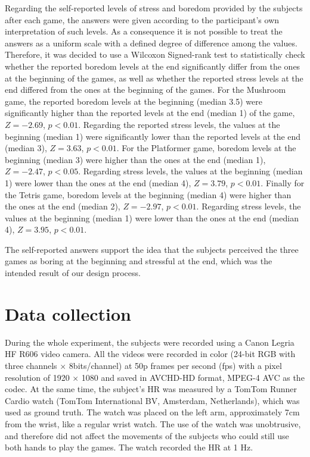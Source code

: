 Regarding the self-reported levels of stress and boredom provided by the subjects after each game, the answers were given according to the participant's own interpretation of such levels. As a consequence it is not possible to treat the answers as a uniform scale with a defined degree of difference among the values. Therefore, it was decided to use a Wilcoxon Signed-rank test to statistically check whether the reported boredom levels at the end significantly differ from the ones at the beginning of the games, as well as whether the reported stress levels at the end differed from the ones at the beginning of the games. For the Mushroom game, the reported boredom levels at the beginning (median 3.5) were significantly higher than the reported levels at the end (median 1) of the game, $Z=-2.69$, $p<0.01$. Regarding the reported stress levels, the values at the beginning (median 1) were significantly lower than the reported levels at the end (median 3), $Z=3.63$, $p<0.01$. For the Platformer game, boredom levels at the beginning (median 3) were higher than the ones at the end (median 1), $Z=-2.47$, $p<0.05$. Regarding stress levels, the values at the beginning (median 1) were lower than the ones at the end (median 4), $Z=3.79$, $p<0.01$. Finally for the Tetris game, boredom levels at the beginning (median 4) were higher than the ones at the end (median 2), $Z=-2.97$, $p<0.01$. Regarding stress levels, the values at the beginning (median 1) were lower than the ones at the end (median 4), $Z=3.95$, $p<0.01$.

The self-reported answers support the idea that the subjects perceived the three games as boring at the beginning and stressful at the end, which was the intended result of our design process.

\section{Data collection}

During the whole experiment, the subjects were recorded using a Canon Legria HF R606 video camera. All the videos were recorded in color (24-bit RGB with three channels $\times$ 8bits/channel) at 50p frames per second (fps) with a pixel resolution of 1920 $\times$ 1080 and saved in AVCHD-HD format, MPEG-4 AVC as the codec. At the same time, the subject's HR was measured by a TomTom Runner Cardio watch (TomTom International BV, Amsterdam, Netherlands), which was used as ground truth. The watch was placed on the left arm, approximately 7cm from the wrist, like a regular wrist watch. The use of the watch was unobtrusive, and therefore did not affect the movements of the subjects who could still use both hands to play the games. The watch recorded the HR at 1 Hz.

